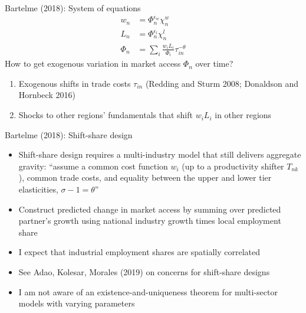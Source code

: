 \documentclass[11pt,notes=hide,aspectratio=169]{beamer}
\begin{document}
\begin{frame}{Bartelme (2018): System of equations}
\begin{align*}
w_n &= \Phi_n^{\epsilon_w} \chi_n^w
\\
L_n &= \Phi_n^{\epsilon_l} \chi_n^l
\\
\Phi_n &= \sum_{i} \frac{w_i L_i}{\Phi_i} \tau_{in}^{-\theta}
\end{align*}
How to get exogenous variation in market access $\Phi_n$ over time?
\begin{enumerate}
\item 
Exogenous shifts in trade costs $\tau_{in}$
(Redding and Sturm 2008; Donaldson and Hornbeck 2016)
\item 
Shocks to other regions' fundamentals that shift $w_i L_i$ in other regions
\end{enumerate}
\end{frame}
\begin{frame}{Bartelme (2018): Shift-share design}
\begin{itemize}
\item Shift-share design requires a multi-industry model that still delivers aggregate gravity:
``assume a common cost function $w_i$ (up to a productivity shifter $T_{nk}$), common trade costs, and equality between the upper and lower tier elasticities, $\sigma - 1 = \theta$''
\item Construct predicted change in market access by summing over predicted partner's growth using national industry growth times local employment share
\item I expect that industrial employment shares are spatially correlated
\item See Adao, Kolesar, Morales (2019) on concerns for shift-share designs
\item I am not aware of an existence-and-uniqueness theorem for multi-sector models with varying parameters
\end{itemize}
\end{frame}
\end{document}
